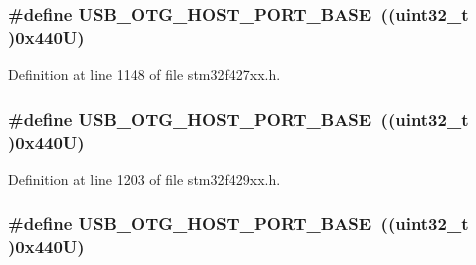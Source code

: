 \subsubsection[{\texorpdfstring{U\+S\+B\+\_\+\+O\+T\+G\+\_\+\+H\+O\+S\+T\+\_\+\+P\+O\+R\+T\+\_\+\+B\+A\+SE}{USB_OTG_HOST_PORT_BASE}}]{\setlength{\rightskip}{0pt plus 5cm}\#define U\+S\+B\+\_\+\+O\+T\+G\+\_\+\+H\+O\+S\+T\+\_\+\+P\+O\+R\+T\+\_\+\+B\+A\+SE~((uint32\+\_\+t )0x440\+U)}\hypertarget{group___peripheral__memory__map_ga42f433cb79ca69f09972e690fda6737a}{}\label{group___peripheral__memory__map_ga42f433cb79ca69f09972e690fda6737a}


Definition at line 1148 of file stm32f427xx.\+h.

\subsubsection[{\texorpdfstring{U\+S\+B\+\_\+\+O\+T\+G\+\_\+\+H\+O\+S\+T\+\_\+\+P\+O\+R\+T\+\_\+\+B\+A\+SE}{USB_OTG_HOST_PORT_BASE}}]{\setlength{\rightskip}{0pt plus 5cm}\#define U\+S\+B\+\_\+\+O\+T\+G\+\_\+\+H\+O\+S\+T\+\_\+\+P\+O\+R\+T\+\_\+\+B\+A\+SE~((uint32\+\_\+t )0x440\+U)}\hypertarget{group___peripheral__memory__map_ga42f433cb79ca69f09972e690fda6737a}{}\label{group___peripheral__memory__map_ga42f433cb79ca69f09972e690fda6737a}


Definition at line 1203 of file stm32f429xx.\+h.

\subsubsection[{\texorpdfstring{U\+S\+B\+\_\+\+O\+T\+G\+\_\+\+H\+O\+S\+T\+\_\+\+P\+O\+R\+T\+\_\+\+B\+A\+SE}{USB_OTG_HOST_PORT_BASE}}]{\setlength{\rightskip}{0pt plus 5cm}\#define U\+S\+B\+\_\+\+O\+T\+G\+\_\+\+H\+O\+S\+T\+\_\+\+P\+O\+R\+T\+\_\+\+B\+A\+SE~((uint32\+\_\+t )0x440\+U)}\hypertarget{group___peripheral__memory__map_ga42f433cb79ca69f09972e690fda6737a}{}\label{group___peripheral__memory__map_ga42f433cb79ca69f09972e690fda6737a}


